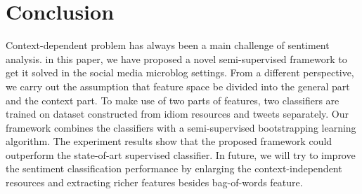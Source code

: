 \documentclass{llncs}
\begin{document}
\section{Conclusion}
\label{conclusion}
Context-dependent problem has always been a main challenge of sentiment analysis.
in this paper, we have proposed a novel semi-supervised framework to get it solved in the social media microblog settings. 
From a different perspective, we carry out the assumption that feature space be divided into the general part and the context part.
To make use of two parts of features, two classifiers are trained on dataset constructed from idiom resources and tweets separately. 
Our framework combines the classifiers with a semi-supervised bootstrapping learning algorithm. 
The experiment results show that the proposed framework could outperform the state-of-art supervised classifier. 
In future, we will try to improve the sentiment classification performance by enlarging the context-independent resources and extracting richer features besides bag-of-words feature.



\end{document}
